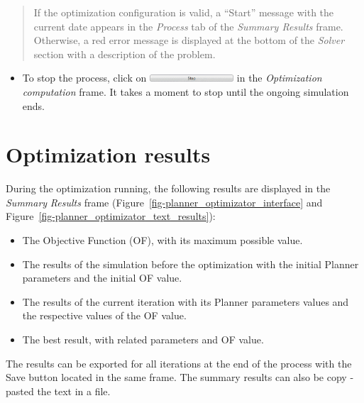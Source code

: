 \documentclass[
  letterpaper,
  DIV=11,
  numbers=noendperiod]{scrreprt}
\providecommand{\tightlist}{%
  \setlength{\itemsep}{0pt}\setlength{\parskip}{0pt}}\usepackage{longtable,booktabs,array}
\begin{document}
\begin{quote}
If the optimization configuration is valid, a ``Start'' message with the
current date appears in the \emph{Process} tab of the \emph{Summary
Results} frame. Otherwise, a red error message is displayed at the
bottom of the \emph{Solver} section with a description of the problem.
\end{quote}

\begin{itemize}
\tightlist
\item
  {To stop the process, click on
  \includegraphics[width=\textwidth,height=0.11in]{./figures/fig-icon_calibrator_stop.png}
  in the \emph{Optimization computation} frame.} It takes a moment to
  stop until the ongoing simulation ends.
\end{itemize}

\hypertarget{optimization-results}{%
\section{Optimization results}\label{optimization-results}}

During the optimization running, the following results are displayed in
the \emph{Summary} \emph{Results} frame
(Figure~\ref{fig-planner_optimizator_interface} and
Figure~\ref{fig-planner_optimizator_text_results}):

\begin{itemize}
\item
  The Objective Function (OF), with its maximum possible value.
\item
  The results of the simulation before the optimization with the initial
  Planner parameters and the initial OF value.
\item
  The results of the current iteration with its Planner parameters
  values and the respective values of the OF value.
\item
  The best result, with related parameters and OF value.
\end{itemize}

The results can be exported for all iterations at the end of the process
with the Save button located in the same frame. The summary results can
also be copy -pasted the text in a file.
\end{document}
